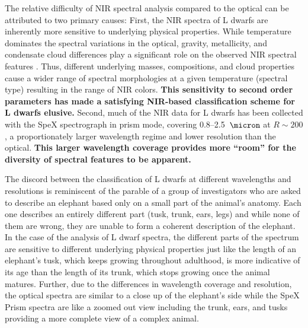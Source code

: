 \documentclass[12pt]{aastex6}
\begin{document}
The relative difficulty of NIR spectral analysis compared to the optical can be attributed to two primary causes:
First, the NIR spectra of L dwarfs are inherently more sensitive to underlying physical properties.
While temperature dominates the spectral variations in the optical, gravity, metallicity, and condensate cloud differences play a significant role on the observed NIR spectral features \citep{Jones:1997hb,Knapp04}.
Thus, different underlying masses, compositions, and cloud properties cause a wider range of spectral morphologies at a given temperature (spectral type) resulting in the range of NIR colors.
\textbf{This sensitivity to second order parameters has made a satisfying NIR-based classification scheme for L dwarfs elusive.}
Second, much of the NIR data for L dwarfs has been collected with the SpeX spectrograph in prism mode, covering 0.8--2.5~$\micron$ at $R\sim200$, a proportionately larger wavelength regime and lower resolution than the optical.
\textbf{This larger wavelength coverage provides more ``room'' for the diversity of spectral features to be apparent.}

The discord between the classification of L dwarfs at different wavelengths and resolutions is reminiscent of the parable of a group of investigators who are asked to describe an elephant based only on a small part of the animal's anatomy.
Each one describes an entirely different part (tusk, trunk, ears, legs) and while none of them are wrong, they are unable to form a coherent description of the elephant.
In the case of the analysis of L dwarf spectra, the different parts of the spectrum are sensitive to different underlying physical properties just like the length of an elephant's tusk, which keeps growing throughout adulthood, is more indicative of its age than the length of its trunk, which stops growing once the animal matures.
Further, due to the differences in wavelength coverage and resolution, the optical spectra are similar to a close up of the elephant's side while the SpeX Prism spectra are like a zoomed out view including the trunk, ears, and tusks providing a more complete view of a complex animal.
\end{document}
